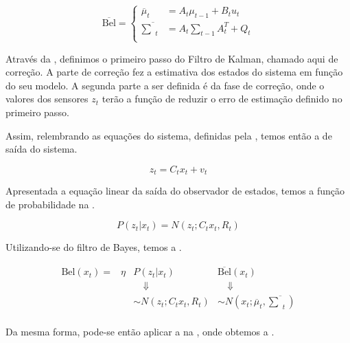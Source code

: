 \begin{equation}
    \overline{\text{Bel}} = 
    \left\{
    \begin{aligned}
            \overline{\mu}_t & = A_t\mu_{t-1} + B_t u_t\\
            \overline{\textstyle\sum}_t & = A_t {\textstyle\sum}_{t-1} A_t^T+ Q_t\\
    \end{aligned} \right.
    \label{eq:bayes05}
\end{equation}

Através da , definimos o primeiro passo do Filtro de Kalman, chamado aqui de correção. A parte de correção fez a estimativa dos estados do sistema em função do seu modelo.
A segunda parte a ser definida é da fase de correção, onde o valores dos sensores $z_t$ terão a função de reduzir o erro de estimação definido no primeiro passo.

Assim, relembrando as equações do sistema, definidas pela , temos então a  de saída do sistema.

\begin{equation}
    z_t = C_t x_t + v_t
    \label{eq:bayes10}    
\end{equation}

Apresentada a equação linear da saída do observador de estados, temos a função de probabilidade na .

\begin{equation}
    P(z_t| x_t)= N\left(z_t; C_t x_t, R_t\right)
    \label{eq:bayes11}
\end{equation}   

Utilizando-se do filtro de Bayes, temos a .

\begin{equation}
    \label{eq:bayes12}
    \begin{matrix}
        \text{Bel}(x_t) = &  \eta & P(z_t| x_t) & \overline{\text{Bel}}(x_t) \\
        & & \quad \Downarrow & \quad\Downarrow \\
        & & \sim N\left(z_t; C_t x_t, R_t\right) & \sim N\left(x_t; \overline{\mu}_t, \overline{\textstyle\sum}_t\right) \\
    \end{matrix}
\end{equation}

Da mesma forma, pode-se então aplicar a  na , onde obtemos a .

